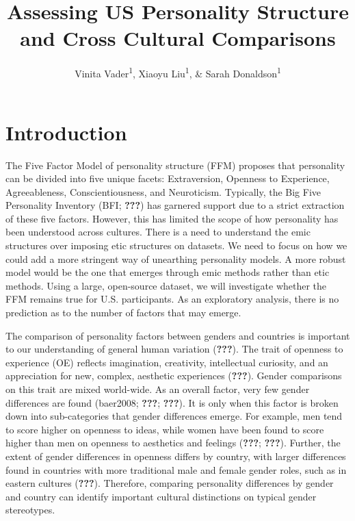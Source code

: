 \documentclass[
  english,
  man]{apa6}
\title{Assessing US Personality Structure and Cross Cultural Comparisons}
\author{Vinita Vader\textsuperscript{1}, Xiaoyu Liu\textsuperscript{1}, \& Sarah Donaldson\textsuperscript{1}}
\date{}
\affiliation{\vspace{0.5cm}\textsuperscript{1} University of Oregon}
\begin{document}
\maketitle

\hypertarget{introduction}{%
\section{Introduction}\label{introduction}}

The Five Factor Model of personality structure (FFM) proposes that personality can be divided into five unique facets: Extraversion, Openness to Experience, Agreeableness, Conscientiousness, and Neuroticism. Typically, the Big Five Personality Inventory (BFI; {\textbf{???}}) has garnered support due to a strict extraction of these five factors. However, this has limited the scope of how personality has been understood across cultures. There is a need to understand the emic structures over imposing etic structures on datasets. We need to focus on how we could add a more stringent way of unearthing personality models. A more robust model would be the one that emerges through emic methods rather than etic methods. Using a large, open-source dataset, we will investigate whether the FFM remains true for U.S. participants. As an exploratory analysis, there is no prediction as to the number of factors that may emerge.

The comparison of personality factors between genders and countries is important to our understanding of general human variation ({\textbf{???}}). The trait of openness to experience (OE) reflects imagination, creativity, intellectual curiosity, and an appreciation for new, complex, aesthetic experiences ({\textbf{???}}). Gender comparisons on this trait are mixed world-wide. As an overall factor, very few gender differences are found (baer2008; {\textbf{???}}; {\textbf{???}}). It is only when this factor is broken down into sub-categories that gender differences emerge. For example, men tend to score higher on openness to ideas, while women have been found to score higher than men on openness to aesthetics and feelings ({\textbf{???}}; {\textbf{???}}). Further, the extent of gender differences in openness differs by country, with larger differences found in countries with more traditional male and female gender roles, such as in eastern cultures ({\textbf{???}}). Therefore, comparing personality differences by gender and country can identify important cultural distinctions on typical gender stereotypes.
\end{document}
